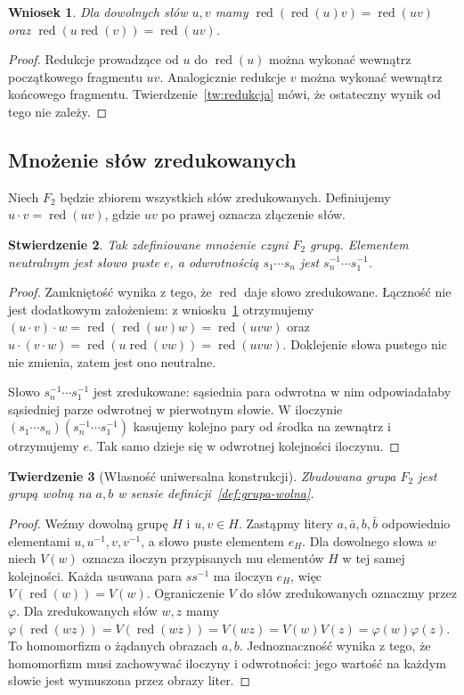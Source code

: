 \documentclass[11pt,a4paper]{article}
\numberwithin{equation}{section}
\theoremstyle{plain}
\newtheorem{twierdzenie}{Twierdzenie}[section]
\newtheorem{stwierdzenie}[twierdzenie]{Stwierdzenie}
\newtheorem{wniosek}[twierdzenie]{Wniosek}
\theoremstyle{definition}
\theoremstyle{remark}
\newcommand{\red}{\operatorname{red}}
\begin{document}
\begin{wniosek}\label{wn:redukcja-iloczyn}
Dla dowolnych słów $u,v$ mamy $\red(\red(u)v)=\red(uv)$ oraz $\red(u\red(v))=\red(uv)$.
\end{wniosek}
\begin{proof}
Redukcje prowadzące od $u$ do $\red(u)$ można wykonać wewnątrz początkowego fragmentu $uv$. Analogicznie redukcje $v$ można wykonać wewnątrz końcowego fragmentu. Twierdzenie~\ref{tw:redukcja} mówi, że ostateczny wynik od tego nie zależy.
\end{proof}

\subsection{Mnożenie słów zredukowanych}
Niech $F_2$ będzie zbiorem wszystkich słów zredukowanych. Definiujemy $u\cdot v=\red(uv)$, gdzie $uv$ po prawej oznacza złączenie słów.
\begin{stwierdzenie}\label{st:grupa-slow}
Tak zdefiniowane mnożenie czyni $F_2$ grupą. Elementem neutralnym jest słowo puste $e$, a odwrotnością $s_1\cdots s_n$ jest $s_n^{-1}\cdots s_1^{-1}$.
\end{stwierdzenie}
\begin{proof}
Zamkniętość wynika z tego, że $\red$ daje słowo zredukowane. Łączność nie jest dodatkowym założeniem: z wniosku~\ref{wn:redukcja-iloczyn} otrzymujemy $(u\cdot v)\cdot w=\red(\red(uv)w)=\red(uvw)$ oraz $u\cdot(v\cdot w)=\red(u\red(vw))=\red(uvw)$. Doklejenie słowa pustego nic nie zmienia, zatem jest ono neutralne.

Słowo $s_n^{-1}\cdots s_1^{-1}$ jest zredukowane: sąsiednia para odwrotna w nim odpowiadałaby sąsiedniej parze odwrotnej w pierwotnym słowie. W iloczynie $(s_1\cdots s_n)(s_n^{-1}\cdots s_1^{-1})$ kasujemy kolejno pary od środka na zewnątrz i otrzymujemy $e$. Tak samo dzieje się w odwrotnej kolejności iloczynu.
\end{proof}
\begin{twierdzenie}[Własność uniwersalna konstrukcji]\label{tw:uniwersalnosc}
Zbudowana grupa $F_2$ jest grupą wolną na $a,b$ w sensie definicji~\ref{def:grupa-wolna}.
\end{twierdzenie}
\begin{proof}
Weźmy dowolną grupę $H$ i $u,v\in H$. Zastąpmy litery $a,\bar a,b,\bar b$ odpowiednio elementami $u,u^{-1},v,v^{-1}$, a słowo puste elementem $e_H$. Dla dowolnego słowa $w$ niech $V(w)$ oznacza iloczyn przypisanych mu elementów $H$ w tej samej kolejności. Każda usuwana para $ss^{-1}$ ma iloczyn $e_H$, więc $V(\red(w))=V(w)$. Ograniczenie $V$ do słów zredukowanych oznaczmy przez $\varphi$. Dla zredukowanych słów $w,z$ mamy $\varphi(\red(wz))=V(\red(wz))=V(wz)=V(w)V(z)=\varphi(w)\varphi(z)$. To homomorfizm o żądanych obrazach $a,b$. Jednoznaczność wynika z tego, że homomorfizm musi zachowywać iloczyny i odwrotności: jego wartość na każdym słowie jest wymuszona przez obrazy liter.
\end{proof}
\end{document}
